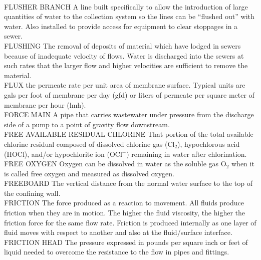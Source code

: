 \documentclass{article}
\begin{document}
\vspace{0.3cm}\\
FLUSHER BRANCH
A line built specifically to allow the introduction of large quantities of water to the collection system so the lines can be “flushed out” with water. Also installed to provide access for equipment to clear stoppages in a sewer. 
\vspace{0.3cm}\\
FLUSHING
The removal of deposits of material which have lodged in sewers because of inadequate velocity of flows. Water is discharged into the sewers at such rates that the larger flow and higher velocities are sufficient to remove the material. 
\vspace{0.3cm}\\
FLUX
the permeate rate per unit area of membrane surface. Typical units are gals per foot of membrane per day (gfd) or liters of permeate per square meter of membrane per hour (lmh).
\vspace{0.3cm}\\
FORCE MAIN
A pipe that carries wastewater under pressure from the discharge side of a pump to a point of gravity flow downstream.
\vspace{0.3cm}\\
FREE AVAILABLE RESIDUAL CHLORINE
That portion of the total available chlorine residual composed of dissolved chlorine gas (Cl$_2$), hypochlorous acid (HOCl), and/or hypochlorite ion (OCl$^-$) remaining in water after chlorination.
\vspace{0.3cm}\\
FREE OXYGEN
Oxygen can be dissolved in water as the soluble gas O$_2$ when it is called free oxygen and measured as dissolved oxygen.
\vspace{0.3cm}\\
FREEBOARD
The vertical distance from the normal water surface to the top of the confining wall.
\vspace{0.3cm}\\
FRICTION
The force produced as a reaction to movement. All fluids produce friction when they are in motion. The higher the fluid viscosity, the higher the friction force for the same flow rate. Friction is produced internally as one layer of fluid moves with respect to another and also at the fluid/surface interface.
\vspace{0.3cm}\\
FRICTION HEAD
The pressure expressed in pounds per square inch or feet of liquid needed to overcome the resistance to the flow in pipes and fittings.
\end{document}
